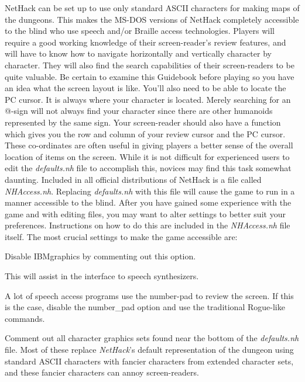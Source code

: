 NetHack can be set up to use only standard ASCII characters for making
maps of the dungeons. This makes the MS-DOS versions of NetHack completely
accessible to the blind who use speech and/or Braille access technologies.
Players will require a good working knowledge of their screen-reader's
review features, and will have to know how to navigate horizontally and
vertically character by character. They will also find the search
capabilities of their screen-readers to be quite valuable. Be certain to
examine this Guidebook before playing so you have an idea what the screen
layout is like. You'll also need to be able to locate the PC cursor. It is
always where your character is located. Merely searching for an @-sign will
not always find your character since there are other humanoids represented
by the same sign. Your screen-reader should also have a function which
gives you the row and column of your review cursor and the PC cursor.
These co-ordinates are often useful in giving players a better sense of the
overall location of items on the screen.
While it is not difficult for experienced users to edit the {\it defaults.nh\/}
file to accomplish this, novices may find this task somewhat daunting.
Included in all official distributions of NetHack is a file called
{\it NHAccess.nh\/}.  Replacing {\it defaults.nh\/} with this file will cause
the game to run in a manner accessible to the blind. After you have gained
some experience with the game and with editing files, you may want to alter
settings to better suit your preferences. Instructions on how to do this
are included in the {\it NHAccess.nh\/} file itself. The most crucial
settings to make the game accessible are:
\blist{}
\item[\ib{IBMgraphics}]
Disable IBMgraphics by commenting out this option.
\item[\ib{menustyle:traditional}]
This will assist in the interface to speech synthesizers.
\item[\ib{number\_pad}]
A lot of speech access programs use the number-pad to review the screen.
If this is the case, disable the number\_pad option and use the traditional
Rogue-like commands.
\item[\ib{Character graphics}]
Comment out all character graphics sets found near the bottom of the
{\it defaults.nh\/} file.  Most of these replace {\it NetHack\/}'s
default representation of the dungeon using standard ASCII characters
with fancier characters from extended character sets, and these fancier
characters can annoy screen-readers.
\elist

